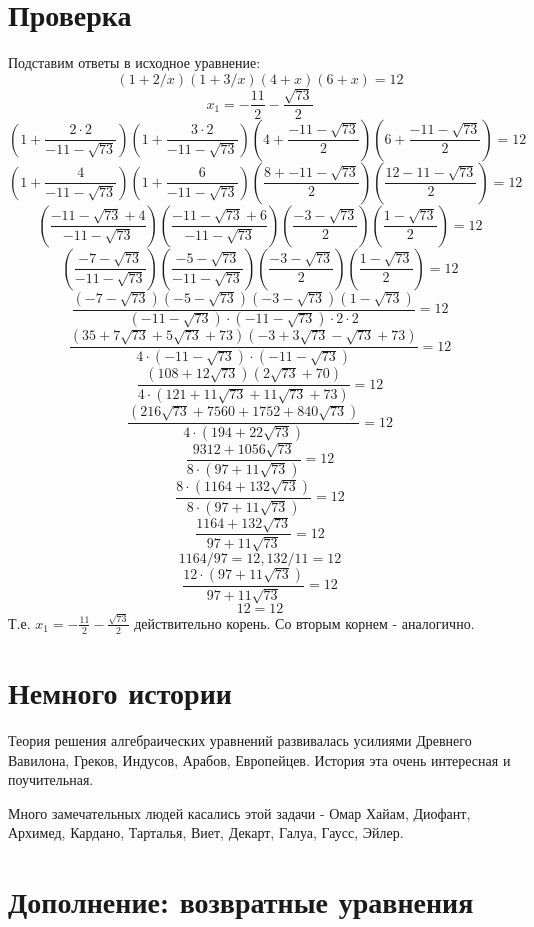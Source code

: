 \documentclass{article}
\begin{document}
\section{Проверка}
Подставим ответы в исходное уравнение:
$$(1+2/x)(1+3/x)(4+x)(6+x)=12$$
$$x_1=-\frac{11}{2}-\frac{\sqrt{73}}{2}$$
$$(1+\frac{2\cdot 2}{-11-\sqrt{73}})(1+\frac{3\cdot 2}{-11-\sqrt{73}})(4+\frac{-11-\sqrt{73}}{2})(6+\frac{-11-\sqrt{73}}{2})=12$$
$$(1+\frac{4}{-11-\sqrt{73}})(1+\frac{6}{-11-\sqrt{73}})(\frac{8+-11-\sqrt{73}}{2})(\frac{12-11-\sqrt{73}}{2})=12$$
$$(\frac{-11-\sqrt{73}+4}{-11-\sqrt{73}})(\frac{-11-\sqrt{73}+6}{-11-\sqrt{73}})(\frac{-3-\sqrt{73}}{2})(\frac{1-\sqrt{73}}{2})=12$$
$$(\frac{-7-\sqrt{73}}{-11-\sqrt{73}})(\frac{-5-\sqrt{73}}{-11-\sqrt{73}})(\frac{-3-\sqrt{73}}{2})(\frac{1-\sqrt{73}}{2})=12$$
$$\frac{  (-7-\sqrt{73})(-5-\sqrt{73})(-3-\sqrt{73})({1-\sqrt{73}})}{({-11-\sqrt{73}})\cdot ({-11-\sqrt{73}})\cdot {2}\cdot {2}}=12$$
$$\frac{(35 + 7\sqrt{73}+5\sqrt{73}+73)(-3+3\sqrt{73}-\sqrt{73}+73)}{4\cdot ({-11-\sqrt{73}})\cdot ({-11-\sqrt{73}})}=12$$
$$\frac{(108 + 12\sqrt{73})(2\sqrt{73}+70)}{4\cdot ({121+11\sqrt{73}+11\sqrt{73}+73})}=12$$
$$\frac{(216\sqrt{73}+7560+1752+840\sqrt{73})}{4\cdot ({194+22\sqrt{73}})}=12$$
$$\frac{9312+1056\sqrt{73}}{8\cdot ({97+11\sqrt{73}})}=12$$
$$\frac{8\cdot (1164+132\sqrt{73})}{8\cdot ({97+11\sqrt{73}})}=12$$
$$\frac{1164+132\sqrt{73}}{{97+11\sqrt{73}}}=12$$
$$1164/97=12, 132/11=12$$
$$\frac{12\cdot (97+11\sqrt{73})}{{97+11\sqrt{73}}}=12$$
$$12=12$$
Т.е. $x_1=-\frac{11}{2}-\frac{\sqrt{73}}{2}$ действительно корень. Со вторым корнем - аналогично.

\section{Немного истории}
Теория решения алгебраических уравнений развивалась усилиями Древнего Вавилона, Греков, Индусов, Арабов, Европейцев. История эта очень интересная и поучительная.

Много замечательных людей касались этой задачи - Омар Хайам, Диофант, Архимед, Кардано, Тарталья, Виет, Декарт, Галуа, Гаусс, Эйлер.

\section{Дополнение: возвратные уравнения}
\end{document}
